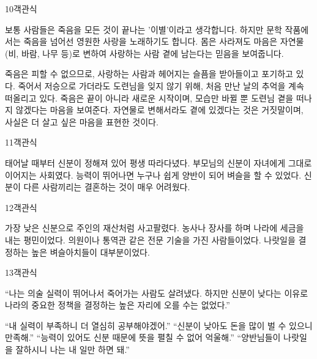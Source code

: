 \documentclass[fs95,seriesFre]{korfarm-base}
\begin{document}
\begin{kfQBlock}{10}{객관식}
\begin{kfEvidence}보통 사람들은 죽음을 모든 것이 끝나는 '이별'이라고 생각합니다. 하지만 문학 작품에서는 죽음을 넘어선 영원한 사랑을 노래하기도 합니다. 몸은 사라져도 마음은 자연물(비, 바람, 나무 등)로 변하여 사랑하는 사람 곁에 남는다는 믿음을 보여줍니다.\end{kfEvidence}
\begin{kfChoices}
\kfChoice 죽음은 피할 수 없으므로, 사랑하는 사람과 헤어지는 슬픔을 받아들이고 포기하고 있다.
\kfChoice 죽어서 저승으로 가더라도 도련님을 잊지 않기 위해, 처음 만난 날의 추억을 계속 떠올리고 있다.
\kfChoice 죽음은 끝이 아니라 새로운 시작이며, 모습만 바뀔 뿐 도련님 곁을 떠나지 않겠다는 마음을 보여준다.
\kfChoice 자연물로 변해서라도 곁에 있겠다는 것은 거짓말이며, 사실은 더 살고 싶은 마음을 표현한 것이다.
\end{kfChoices}
\end{kfQBlock}

\begin{kfQBlock}{11}{객관식}
\begin{kfChoices}
\kfChoice 태어날 때부터 신분이 정해져 있어 평생 따라다녔다.
\kfChoice 부모님의 신분이 자녀에게 그대로 이어지는 사회였다.
\kfChoice 능력이 뛰어나면 누구나 쉽게 양반이 되어 벼슬을 할 수 있었다.
\kfChoice 신분이 다른 사람끼리는 결혼하는 것이 매우 어려웠다.
\end{kfChoices}
\end{kfQBlock}

\begin{kfQBlock}{12}{객관식}
\begin{kfChoices}
\kfChoice 가장 낮은 신분으로 주인의 재산처럼 사고팔렸다.
\kfChoice 농사나 장사를 하며 나라에 세금을 내는 평민이었다.
\kfChoice 의원이나 통역관 같은 전문 기술을 가진 사람들이었다.
\kfChoice 나랏일을 결정하는 높은 벼슬아치들이 대부분이었다.
\end{kfChoices}
\end{kfQBlock}

\begin{kfQBlock}{13}{객관식}
\begin{kfEvidence}“나는 의술 실력이 뛰어나서 죽어가는 사람도 살려냈다. 하지만 신분이 낮다는 이유로 나라의 중요한 정책을 결정하는 높은 자리에 오를 수는 없었다.”\end{kfEvidence}
\begin{kfChoices}
\kfChoice “내 실력이 부족하니 더 열심히 공부해야겠어.”
\kfChoice “신분이 낮아도 돈을 많이 벌 수 있으니 만족해.”
\kfChoice “능력이 있어도 신분 때문에 뜻을 펼칠 수 없어 억울해.”
\kfChoice “양반님들이 나랏일을 잘하시니 나는 내 일만 하면 돼.”
\end{kfChoices}
\end{kfQBlock}
\end{document}
